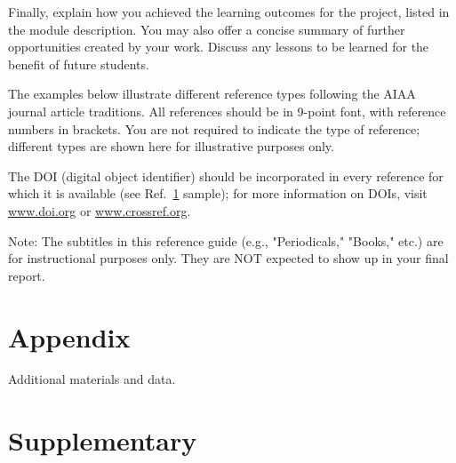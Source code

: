 \documentclass{engr1000j-s2}
\begin{document}
  Finally, explain how you achieved the learning outcomes for the project, listed in the module description. You may also offer a concise summary of further opportunities created by your work. Discuss any lessons to be learned for the benefit of future students.

  \hspace{1em}

  
  
  The examples below illustrate different reference types following the AIAA journal article traditions. All references should be in 9-point font, with reference numbers in brackets. You are not required to indicate the type of reference; different types are shown here for illustrative purposes only.

  The DOI (digital object identifier) should be incorporated in every reference for which it is available (see Ref.~\href{https://doi.org/10.1234/example.doi}{1} sample); for more information on DOIs, visit \href{https://www.doi.org}{www.doi.org} or \href{https://www.crossref.org}{www.crossref.org}.
  
  Note: The subtitles in this reference guide (e.g., "Periodicals," "Books," etc.) are for instructional purposes only. They are NOT expected to show up in your final report.



  \newpage
  \appendix
  \section{Appendix}
  Additional materials and data.

  \newpage
  \section{Supplementary}
\end{document}
